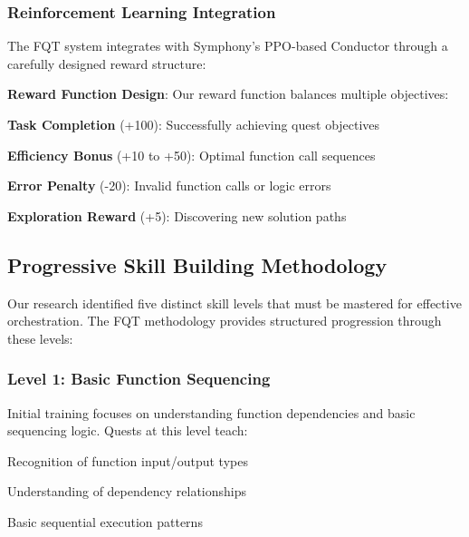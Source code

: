 \subsubsection*{Reinforcement Learning Integration}

The FQT system integrates with Symphony's PPO-based Conductor through a carefully designed reward structure:

\begin{alertbox}
\textbf{Reward Function Design}: Our reward function balances multiple objectives:
\begin{compactlist}
    \item \textbf{Task Completion} (+100): Successfully achieving quest objectives
    \item \textbf{Efficiency Bonus} (+10 to +50): Optimal function call sequences
    \item \textbf{Error Penalty} (-20): Invalid function calls or logic errors
    \item \textbf{Exploration Reward} (+5): Discovering new solution paths
\end{compactlist}
\end{alertbox}

\subsection*{Progressive Skill Building Methodology}

Our research identified five distinct skill levels that must be mastered for effective orchestration. The FQT methodology provides structured progression through these levels:

\subsubsection*{Level 1: Basic Function Sequencing}

Initial training focuses on understanding function dependencies and basic sequencing logic. Quests at this level teach:

\begin{compactlist}
    \item Recognition of function input/output types
    \item Understanding of dependency relationships
    \item Basic sequential execution patterns
\end{compactlist}

